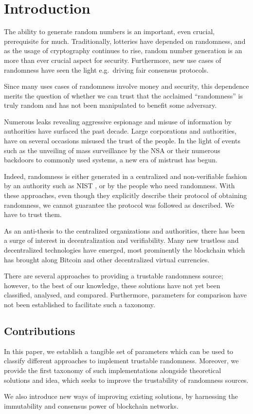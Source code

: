 \section{Introduction}\label{cha:introduction}

The ability to generate random numbers is an important, even crucial, prerequisite for much.
Traditionally, lotteries have depended on randomness, and as the usage of cryptography continues to rise, random number generation is an more than ever crucial aspect for security.
Furthermore, new use cases of randomness have seen the light e.g.\ driving fair consensus protocols.

Since many uses cases of randomness involve money and security, this dependence merits the question of whether we can trust that the acclaimed \enquote{randomness} is truly random and has not been manipulated to benefit some adversary.

Numerous leaks revealing aggressive espionage and misuse of information by authorities have surfaced the past decade.
Large corporations and authorities, have on several occasions misused the trust of the people.
In the light of events such as the unveiling of mass surveillance by the NSA or their numerous backdoors to commonly used systems, a new era of mistrust has begun.

Indeed, randomness is either generated in a centralized and non-verifiable fashion by an authority such as NIST , or by the people who need randomness.
With these approaches, even though they explicitly describe their protocol of obtaining randomness, we cannot guarantee the protocol was followed as described.
We have to trust them. 

As an anti-thesis to the centralized organizations and authorities, there has been a surge of interest in decentralization and verifiability.
Many new trustless and decentralized technologies have emerged, most prominently the blockchain which has brought along Bitcoin and other decentralized virtual currencies.

There are several approaches to providing a trustable randomness source; however, to the best of our knowledge, these solutions have not yet been classified, analysed, and compared.
Furthermore, parameters for comparison have not been established to facilitate such a taxonomy.

\subsection*{Contributions}\label{subsec:contributions}
In this paper, we establish a tangible set of parameters which can be used to classify different approaches to implement trustable randomness.
Moreover, we provide the first taxonomy of such implementations alongside theoretical solutions and idea, which seeks to improve the trustability of randomness sources.

We also introduce new ways of improving existing solutions, by harnessing the immutability and consensus power of blockchain networks.

